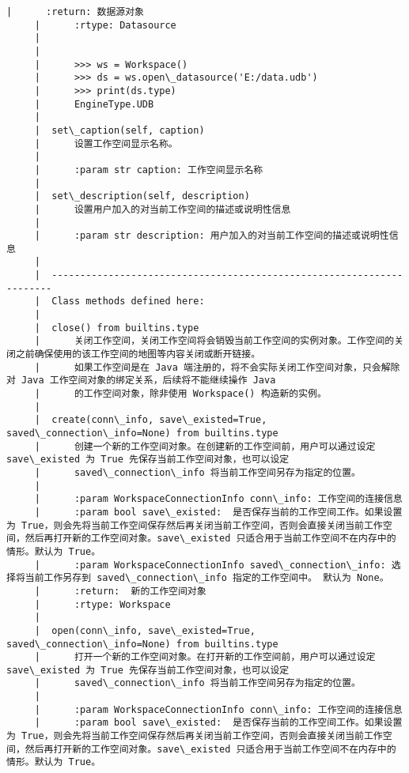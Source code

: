 \documentclass[11pt]{article}
\begin{document}
\begin{Verbatim}[commandchars=\\\{\}]
     |      :return: 数据源对象
     |      :rtype: Datasource
     |      
     |      
     |      >>> ws = Workspace()
     |      >>> ds = ws.open\_datasource('E:/data.udb')
     |      >>> print(ds.type)
     |      EngineType.UDB
     |  
     |  set\_caption(self, caption)
     |      设置工作空间显示名称。
     |      
     |      :param str caption: 工作空间显示名称
     |  
     |  set\_description(self, description)
     |      设置用户加入的对当前工作空间的描述或说明性信息
     |      
     |      :param str description: 用户加入的对当前工作空间的描述或说明性信息
     |  
     |  ----------------------------------------------------------------------
     |  Class methods defined here:
     |  
     |  close() from builtins.type
     |      关闭工作空间，关闭工作空间将会销毁当前工作空间的实例对象。工作空间的关闭之前确保使用的该工作空间的地图等内容关闭或断开链接。
     |      如果工作空间是在 Java 端注册的，将不会实际关闭工作空间对象，只会解除对 Java 工作空间对象的绑定关系，后续将不能继续操作 Java
     |      的工作空间对象，除非使用 Workspace() 构造新的实例。
     |  
     |  create(conn\_info, save\_existed=True, saved\_connection\_info=None) from builtins.type
     |      创建一个新的工作空间对象。在创建新的工作空间前，用户可以通过设定 save\_existed 为 True 先保存当前工作空间对象，也可以设定
     |      saved\_connection\_info 将当前工作空间另存为指定的位置。
     |      
     |      :param WorkspaceConnectionInfo conn\_info: 工作空间的连接信息
     |      :param bool save\_existed:  是否保存当前的工作空间工作。如果设置为 True，则会先将当前工作空间保存然后再关闭当前工作空间，否则会直接关闭当前工作空间，然后再打开新的工作空间对象。save\_existed 只适合用于当前工作空间不在内存中的情形。默认为 True。
     |      :param WorkspaceConnectionInfo saved\_connection\_info: 选择将当前工作另存到 saved\_connection\_info 指定的工作空间中。 默认为 None。
     |      :return:  新的工作空间对象
     |      :rtype: Workspace
     |  
     |  open(conn\_info, save\_existed=True, saved\_connection\_info=None) from builtins.type
     |      打开一个新的工作空间对象。在打开新的工作空间前，用户可以通过设定 save\_existed 为 True 先保存当前工作空间对象，也可以设定
     |      saved\_connection\_info 将当前工作空间另存为指定的位置。
     |      
     |      :param WorkspaceConnectionInfo conn\_info: 工作空间的连接信息
     |      :param bool save\_existed:  是否保存当前的工作空间工作。如果设置为 True，则会先将当前工作空间保存然后再关闭当前工作空间，否则会直接关闭当前工作空间，然后再打开新的工作空间对象。save\_existed 只适合用于当前工作空间不在内存中的情形。默认为 True。

\end{Verbatim}
\end{document}
